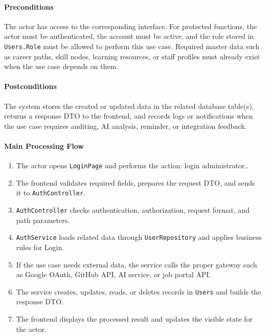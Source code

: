 \paragraph{Preconditions}

The actor has access to the corresponding interface. For protected functions, the actor must be authenticated, the account must be active, and the role stored in \texttt{Users.Role} must be allowed to perform this use case. Required master data such as career paths, skill nodes, learning resources, or staff profiles must already exist when the use case depends on them.

\paragraph{Postconditions}

The system stores the created or updated data in the related database table(s), returns a response DTO to the frontend, and records logs or notifications when the use case requires auditing, AI analysis, reminder, or integration feedback.

\paragraph{Main Processing Flow}

\begin{enumerate}
    \item The actor opens \texttt{LoginPage} and performs the action: login administrator..
    \item The frontend validates required fields, prepares the request DTO, and sends it to \texttt{AuthController}.
    \item \texttt{AuthController} checks authentication, authorization, request format, and path parameters.
    \item \texttt{AuthService} loads related data through \texttt{UserRepository} and applies business rules for Login.
    \item If the use case needs external data, the service calls the proper gateway such as Google OAuth, GitHub API, AI service, or job portal API.
    \item The service creates, updates, reads, or deletes records in \texttt{Users} and builds the response DTO.
    \item The frontend displays the processed result and updates the visible state for the actor.
\end{enumerate}

